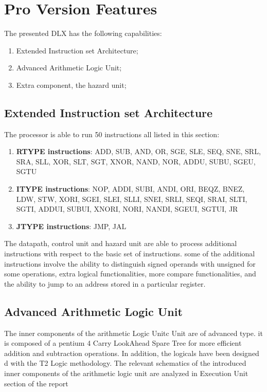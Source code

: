 	\section{Pro Version Features}
		The presented DLX has the following capabilities:
		\begin{enumerate}
			\item Extended Instruction set Architecture;
			\item Advanced Arithmetic Logic Unit;
			\item Extra component, the hazard unit;
			\end{enumerate}

			\newpage
		\subsection{ Extended Instruction set Architecture}
		The processor is able to run 50 instructions all listed in this section:
		\begin{enumerate}
			\item \textbf{RTYPE instructions}: ADD, SUB, AND, OR, SGE, SLE, SEQ, SNE, SRL, SRA, SLL, XOR, SLT, SGT, XNOR, NAND, NOR, ADDU, SUBU, SGEU, SGTU
			\item \textbf{ITYPE instructions}: NOP, ADDI, SUBI, ANDI, ORI, BEQZ, BNEZ, LDW, STW, XORI, SGEI, SLEI, SLLI, SNEI, SRLI, SEQI, SRAI, SLTI, SGTI, ADDUI,
			SUBUI, XNORI, NORI, NANDI, SGEUI, SGTUI, JR
			\item \textbf{JTYPE instructions}: JMP, JAL
			\end{enumerate}
		The datapath, control unit and hazard unit are able to process additional instructions with respect to the basic set of instructions.
		some of the additional instructions involve the ability to distinguish signed operands with unsigned for some operations, extra logical functionalities, more compare functionalities, and the ability
		to jump to an address stored in a particular register.

		\subsection{ Advanced Arithmetic Logic Unit }

		The inner components of the arithmetic Logic Unitc Unit are of advanced type. it is composed of a pentium 4 Carry LookAhead Spare Tree for more efficient addition and subtraction operations. 
		In addition, the logicals have been designed d with the T2 Logic methodology. The relevant schematics of the introduced inner components of the arithmetic logic unit are analyzed in Execution Unit section of the report

